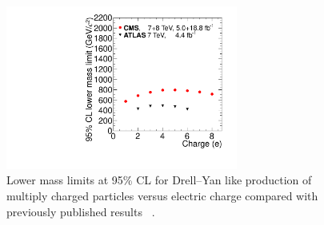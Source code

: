 \begin{figure}
 \begin{center}
 \includegraphics[clip=false, trim=0.0cm 0cm 0.0cm 0cm, width=0.68\textwidth]{figures/DYhscp_resultsNov2012}
 \end{center}
 \caption[Lower mass limits on HSCP produced with various charge compared with previously published results]
{Lower mass limits at 95\% CL for Drell--Yan like production of multiply charged particles versus electric charge compared with previously published results
~\cite{Aad:2013pqd}.
}
   \label{fig:HQmasslimits}
\end{figure}